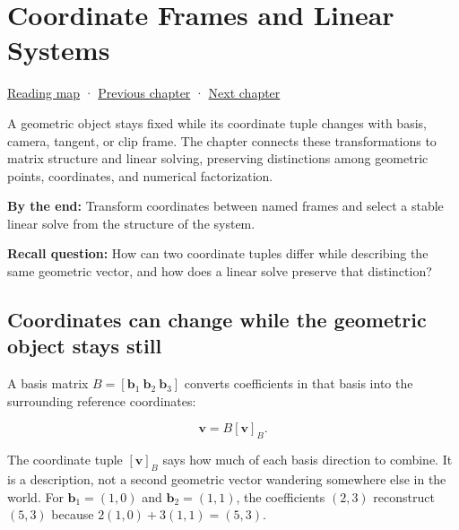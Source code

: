 \chapter{Coordinate Frames and Linear Systems}\label{01-foundations-i-ch019-coordinate-frames-and-linear-systems}\hypertarget{01-foundations-i-ch019}{}\label{stagechapter:01-foundations-i-ch019}

\hypertarget{01-foundations-i-ch019-coordinate-frames-and-linear-systems}{}

\hyperref[volume-reading-map]{Reading map} · \hyperref[01-foundations-i-ch018-vectors-for-light-and-frames]{Previous chapter} · \hyperref[01-foundations-i-ch020-choose-matrix-factorizations-from-structure]{Next chapter}

A geometric object stays fixed while its coordinate tuple changes with basis, camera, tangent, or clip frame. The chapter connects these transformations to matrix structure and linear solving, preserving distinctions among geometric points, coordinates, and numerical factorization.

\textbf{By the end:} Transform coordinates between named frames and select a stable linear solve from the structure of the system.

\textbf{Recall question:} How can two coordinate tuples differ while describing the same geometric vector, and how does a linear solve preserve that distinction?

\section{Coordinates can change while the geometric object stays still}\label{01-foundations-i-ch019-coordinates-can-change-while-the-geometric-object-stays-still}

\hypertarget{01-foundations-i-ch019-coordinates-can-change-while-the-geometric-object-stays-still}{}

A basis matrix \(B=[\mathbf b_1\ \mathbf b_2\ \mathbf b_3]\) converts coefficients in that basis into the surrounding reference coordinates:

\[
\mathbf v=B[\mathbf v]_B.
\]

The coordinate tuple \([\mathbf v]_B\) says how much of each basis direction to combine. It is a description, not a second geometric vector wandering somewhere else in the world. For \(\mathbf b_1=(1,0)\) and \(\mathbf b_2=(1,1)\), the coefficients \((2,3)\) reconstruct \((5,3)\) because \(2(1,0)+3(1,1)=(5,3)\).


